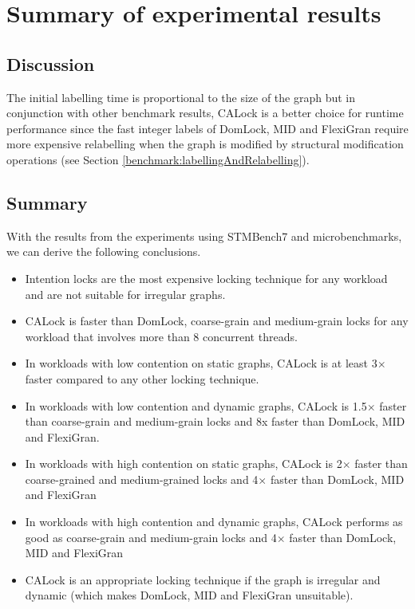 \section{Summary of experimental results}
\subsection{Discussion}
The initial labelling time is proportional to the size of the graph but in conjunction with other benchmark results, CALock is a better choice for runtime performance since the fast integer labels of DomLock, MID and FlexiGran require more expensive relabelling when the graph is modified by structural modification operations (see Section \ref{benchmark:labellingAndRelabelling}).


\subsection{Summary}
With the results from the experiments using STMBench7 and microbenchmarks, we can derive the following conclusions.
\begin{itemize}
	\item Intention locks are the most expensive locking technique for any workload and are not suitable for irregular graphs.
	\item CALock is faster than DomLock, coarse-grain and medium-grain locks for any workload that involves more than 8 concurrent threads.

	\item In workloads with low contention on static graphs, CALock is at least 3$\times$ faster compared to any other locking technique.

	\item  In workloads with low contention and dynamic graphs, CALock is 1.5$\times$ faster than coarse-grain and medium-grain locks and 8x faster than DomLock, MID and FlexiGran.

	\item In workloads with high contention on static graphs, CALock is 2$\times$ faster than coarse-grained and medium-grained locks and 4$\times$ faster than DomLock, MID and FlexiGran
	\item In workloads with high contention and dynamic graphs, CALock performs as good as coarse-grain and medium-grain locks and 4$\times$ faster than DomLock, MID and FlexiGran
	\item CALock is an appropriate locking technique if the graph is irregular and dynamic (which makes DomLock, MID and FlexiGran unsuitable).
\end{itemize}
